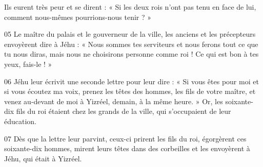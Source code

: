 Ils eurent très peur et se dirent : « Si les deux rois n’ont pas tenu en face de lui, comment nous-mêmes pourrions-nous tenir ? »

05 Le maître du palais et le gouverneur de la ville, les anciens et les précepteurs envoyèrent dire à Jéhu : « Nous sommes tes serviteurs et nous ferons tout ce que tu nous diras, mais nous ne choisirons personne comme roi ! Ce qui est bon à tes yeux, fais-le ! »

06 Jéhu leur écrivit une seconde lettre pour leur dire : « Si vous êtes pour moi et si vous écoutez ma voix, prenez les têtes des hommes, les fils de votre maître, et venez au-devant de moi à Yizréel, demain, à la même heure. » Or, les soixante-dix fils du roi étaient chez les grands de la ville, qui s’occupaient de leur éducation.

07  Dès que la lettre leur parvint, ceux-ci prirent les fils du roi, égorgèrent ces soixante-dix hommes, mirent leurs têtes dans des corbeilles et les envoyèrent à Jéhu, qui était à Yizréel.